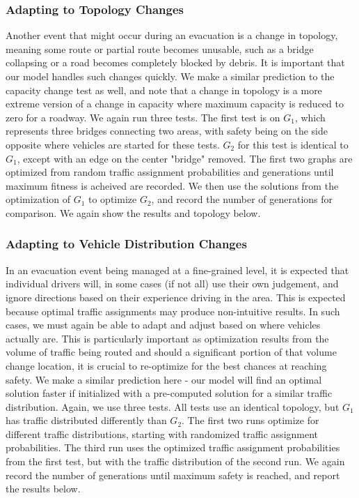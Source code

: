 \documentclass{sig-alternate-05-2015}
\begin{document}
			
			\subsubsection{Adapting to Topology Changes}
			Another event that might occur during an evacuation is a change in topology, meaning some route or partial route becomes unusable, such as a bridge collapsing or a road becomes completely blocked by debris. It is important that our model handles such changes quickly. We make a similar prediction to the capacity change test as well, and note that a change in topology is a more extreme version of a change in capacity where maximum capacity is reduced to zero for a roadway. We again run three tests. The first test is on $G_1$, which represents three bridges connecting two areas, with safety being on the side opposite where vehicles are started for these tests. $G_2$ for this test is identical to $G_1$, except with an edge on the center "bridge" removed. The first two graphs are optimized from random traffic assignment probabilities and generations until maximum fitness is acheived are recorded. We then use the solutions from the optimization of $G_1$ to optimize $G_2$, and record the number of generations for comparison. We again show the results and topology below.
			
			\subsubsection{Adapting to Vehicle Distribution Changes}
			In an evacuation event being managed at a fine-grained level, it is expected that individual drivers will, in some cases (if not all) use their own judgement, and ignore directions based on their experience driving in the area. This is expected because optimal traffic assignments may produce non-intuitive results. In such cases, we must again be able to adapt and adjust based on where vehicles actually are. This is particularly important as optimization results from the volume of traffic being routed and should a significant portion of that volume change location, it is crucial to re-optimize for the best chances at reaching safety. We make a similar prediction here - our model will find an optimal solution faster if initialized with a pre-computed solution for a similar traffic distribution. Again, we use three tests. All tests use an identical topology, but $G_1$ has traffic distributed differently than $G_2$. The first two runs optimize for different traffic distributions, starting with randomized traffic assignment probabilities. The third run uses the optimized traffic assignment probabilities from the first test, but with the traffic distribution of the second run. We again record the number of generations until maximum safety is reached, and report the results below. 
			
\end{document}
